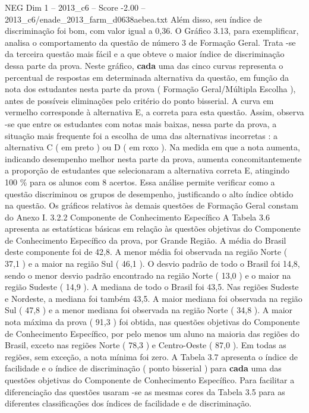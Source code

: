 \begin{textsample}{NEG Dim 1 – 2013\_c6 – Score -2.00 – 2013\_c6/enade\_2013\_farm\_d0638aebea.txt}
Além disso, seu índice de discriminação foi bom, com valor igual a 0,36.
O Gráfico 3.13, para exemplificar, analisa o comportamento da questão de número 3 de Formação Geral.
Trata -se da terceira questão mais fácil e a que obteve o maior índice de discriminação dessa parte da prova.
Neste gráfico, \textbf{cada} uma das cinco curvas representa o percentual de respostas em determinada alternativa da questão, em função da nota dos estudantes nesta parte da prova ( Formação Geral/Múltipla Escolha ), antes de possíveis eliminações pelo critério do ponto bisserial.
A curva em vermelho corresponde à alternativa E, a correta para esta questão.
Assim, observa -se que entre os estudantes com notas mais baixas, nessa parte da prova, a situação mais frequente foi a escolha de uma das alternativas incorretas : a alternativa C ( em preto ) ou D ( em roxo ).
Na medida em que a nota aumenta, indicando desempenho melhor nesta parte da prova, aumenta concomitantemente a proporção de estudantes que selecionaram a alternativa correta E, atingindo 100 \% para os alunos com 8 acertos.
Essa análise permite verificar como a questão discriminou os grupos de desempenho, justificando o alto índice obtido na questão.
Os gráficos relativos às demais questões de Formação Geral constam do Anexo I. 3.2.2 Componente de Conhecimento Específico A Tabela 3.6 apresenta as estatísticas básicas em relação às questões objetivas do Componente de Conhecimento Específico da prova, por Grande Região.
A média do Brasil deste componente foi de 42,8.
A menor média foi observada na região Norte ( 37,1 ) e a maior na região Sul ( 46,1 ).
O desvio padrão de todo o Brasil foi 14,8, sendo o menor desvio padrão encontrado na região Norte ( 13,0 ) e o maior na região Sudeste ( 14,9 ).
A mediana de todo o Brasil foi 43,5.
Nas regiões Sudeste e Nordeste, a mediana foi também 43,5.
A maior mediana foi observada na região Sul ( 47,8 ) e a menor mediana foi observada na região Norte ( 34,8 ).
A maior nota máxima da prova ( 91,3 ) foi obtida, nas questões objetivas do Componente de Conhecimento Específico, por pelo menos um aluno na maioria das regiões do Brasil, exceto nas regiões Norte ( 78,3 ) e Centro-Oeste ( 87,0 ).
Em todas as regiões, sem exceção, a nota mínima foi zero.
A Tabela 3.7 apresenta o índice de facilidade e o índice de discriminação ( ponto bisserial ) para \textbf{cada} uma das questões objetivas do Componente de Conhecimento Específico.
Para facilitar a diferenciação das questões usaram -se as mesmas cores da Tabela 3.5 para as diferentes classificações dos índices de facilidade e de discriminação.

\end{textsample}
